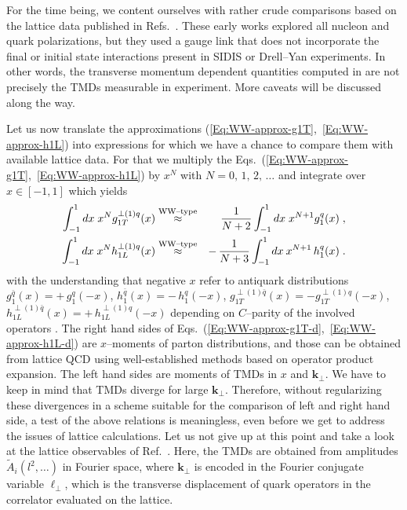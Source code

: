 \documentclass[a4paper,11pt]{article}
\newcommand{\ba}{\begin{eqnarray}}
\newcommand{\ea}{\end{eqnarray}}
\newcommand{\WWtype}{\ensuremath{\stackrel{\text{\scriptsize WW--type}}{\approx}}}
\def\bflperp{{\bm \ell}_\perp}
\def\bfkperp{{\bm k}_\perp}
\begin{document}
For the time being, we content ourselves with rather crude comparisons 
based on the lattice data
published in Refs.~\cite{Hagler:2009mb,Musch:2010ka}. 
These early works explored all nucleon and quark polarizations, but 
they used a gauge link that does not incorporate the final or initial 
state interactions present in SIDIS or Drell--Yan experiments. In other 
words, the transverse momentum dependent quantities computed in
\cite{Hagler:2009mb,Musch:2010ka} are not precisely the TMDs measurable 
in experiment. More caveats will be discussed along the way.

Let us now translate the approximations
(\ref{Eq:WW-approx-g1T},~\ref{Eq:WW-approx-h1L}) into expressions
for which we have a chance to compare them with available lattice data.
For that we multiply the
Eqs.~(\ref{Eq:WW-approx-g1T},~\ref{Eq:WW-approx-h1L}) by $x^N$
with $N=0,\,1,\,2,\,\dots$ and integrate over $x\in[-1,1]$ which yields
\ba
        \int_{-1}^1 d x\;x^N
       g_{1T}^{\perp(1)q}(x)&\WWtype&
        \phantom{-} \,\frac{1}{N+2} \int_{-1}^1 d x \;x^{N+1}g_1^q(x)
        \;,
    \label{Eq:WW-approx-g1T-d}\\
        \int_{-1}^1 d x\;x^N
        h_{1L}^{\perp(1)q}(x)&\WWtype&
        -\,\frac{1}{N+3} \int_{-1}^1 d x\: x^{N+1}\,h_1^q(x)
        \;.
    \label{Eq:WW-approx-h1L-d}
\ea
with the understanding that
negative $x$ refer to antiquark distributions
$g_1^{\bar q}(x) = +\,g_1^{q}(-x)$,
$h_1^{\bar q}(x) = -\,h_1^{q}(-x)$,
$g_{1T}^{\perp(1)\bar q}(x) =- g_{1T}^{\perp(1)q}(-x)$,
$h_{1L}^{\perp(1)\bar q}(x) = +\,h_{1L}^{\perp(1)q}(-x)$
depending on $C$--parity of the involved operators \cite{Mulders:1995dh}.
The right hand sides of 
Eqs.~(\ref{Eq:WW-approx-g1T-d},~\ref{Eq:WW-approx-h1L-d}) are $x$--moments 
of parton distributions, and those can be obtained from lattice QCD using 
well-established methods based on operator product expansion. 
The left hand sides are moments of TMDs in $x$ and $\bfkperp$. We have to 
keep in mind that TMDs diverge for large $\bfkperp$. Therefore, without 
regularizing these divergences in a scheme suitable for the comparison of 
left and right hand side, a test of the above relations is meaningless, 
even before we get to address the issues of lattice calculations. Let us 
not give up at this point and take a look at the lattice observables of 
Ref.~\cite{Musch:2010ka}. Here, the TMDs are obtained from amplitudes 
$\tilde A_i(l^2,\ldots)$ in Fourier space, where $\bfkperp$ is encoded 
in the Fourier conjugate variable $\bflperp$, which is the transverse 
displacement of quark operators in the correlator evaluated on the lattice. 
\end{document}
